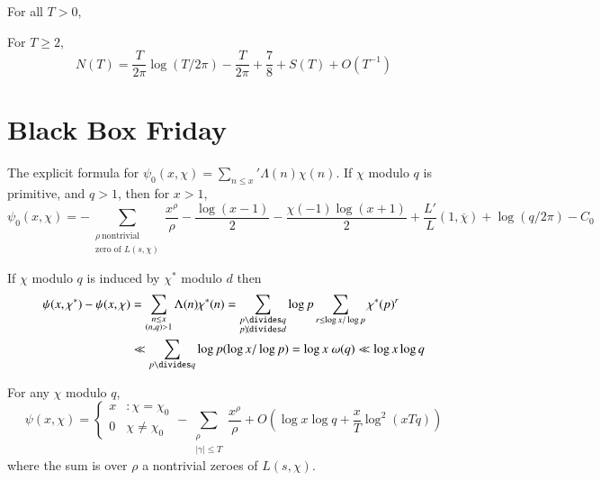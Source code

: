 \begin{theorem}
    For all $T > 0$,
\end{theorem}

\begin{corollary}
    For $T \geq 2$,
    \[ N(T) = \frac{T}{2 \pi} \log(T/2\pi) - \frac{T}{2\pi} + \frac{7}{8} + S(T) + O(T^{-1}) \]
\end{corollary}

\section{Black Box Friday}

The explicit formula for $\psi_0(x,\chi) = \sum_{n \leq x}' \Lambda(n) \chi(n)$. If $\chi$ modulo $q$ is primitive, and $q > 1$, then for $x > 1$,
%
\[ \psi_0(x,\chi) = - \sum_{\substack{\rho\ \text{nontrivial}\\\text{zero of $L(s,\chi)$}}} \frac{x^\rho}{\rho} - \frac{\log(x-1)}{2} - \frac{\chi(-1) \log(x+1)}{2} + \frac{L'}{L}(1,\overline{\chi}) + \log(q/2\pi) - C_0 \]

\begin{remark}
    If $\chi$ modulo $q$ is induced by $\chi^*$ modulo $d$ then
    \begin{align*}
        \psi(x,\chi^*) - \psi(x,\chi) &= \sum_{\substack{n \leq x\\(n,q) > 1}} \Lambda(n) \chi^*(n) = \sum_{\substack{p \divides q\\p \not \divides d}} \log p \sum_{r \leq \log x / \log p} \chi^*(p)^r\\
        &\ll \sum_{p \divides q} \log p (\log x / \log p) = \log x\; \omega(q) \ll \log x \log q
    \end{align*}
\end{remark}

\begin{theorem}
    For any $\chi$ modulo $q$,
    \[ \psi(x,\chi) = \begin{cases} x &: \chi = \chi_0 \\ 0 & \chi \neq \chi_0 \end{cases} - \sum_{\substack{\rho\\|\gamma| \leq T}} \frac{x^\rho}{\rho} + O \left( \log x \log q + \frac{x}{T} \log^2(xTq) \right) \]
    where the sum is over $\rho$ a nontrivial zeroes of $L(s,\chi)$.
\end{theorem}


